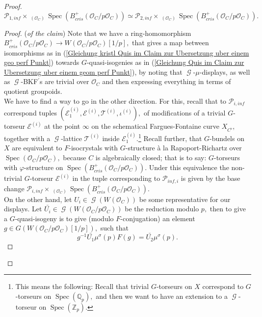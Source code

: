 \documentclass[a4paper,10,5 pt]{amsart}
\theoremstyle{definition}
\DeclareMathOperator{\Spec}{Spec}
\DeclareMathOperator{\Ainf}{\mathbb{A}_{inf}}
\DeclareMathOperator{\G}{\mathcal{G}}
\begin{document}
\begin{proof}
\begin{equation}
\mathcal{P}_{1,inf}\times_{\Ainf(\mathcal{O}_{C})} \Spec(B^{+}_{cris}(\mathcal{O}_{C}/p\mathcal{O}_{C}))\simeq \mathcal{P}_{2,inf}\times_{\Ainf(\mathcal{O}_{C})} \Spec(B^{+}_{cris}(\mathcal{O}_{C}/p\mathcal{O}_{C})).
\end{equation}
\begin{proof}{(\textit{of the claim})}
Note that we have a ring-homomorphism $B^{+}_{cris}(\mathcal{O}_{C}/p\mathcal{O}_{C})\rightarrow W(\mathcal{O}_{C}/p\mathcal{O}_{C})[1/p],$ that gives a map between isomorphisms as in (\ref{Gleichung kristl Quis im Claim zur Ubersetzung uber einem geo perf Punkt}) towards $G$-quasi-isogenies as in (\ref{Gleichung Quis im Claim zur Ubersetzung uber einem geom perf Punkt}), by noting that $\G$-$\mu$-displays, as well as $\G$-BKF$^{\prime}$s are trivial over $\mathcal{O}_{C}$ and then expressing everything in terms of quotient groupoids.
\\
We have to find a way to go in the other direction. For this, recall that to $\mathcal{P}_{i,inf}$ correspond tuples $(\mathcal{E}^{(i)}_{1},\mathcal{E}^{(i)},\mathcal{T}^{(i)},\iota^{(i)}),$ of modifications of a trivial $G$-torseur $\mathcal{E}^{(i)}$ at the point $\infty$ on the schematical Fargues-Fontaine curve $X_{C^{\flat}},$ together with a $\G$-lattice $\mathcal{T}^{(i)}$ inside $\mathcal{E}^{(i)}_{1}.$\footnote{This means the following: Recall that trivial $G$-torseurs on $X$ correspond to $G$-torseurs on $\Spec(\mathbb{Q}_{p}),$ and then we want to have an extension to a $\G$-torseur on $\Spec(\mathbb{Z}_{p}).$} Recall further, that $G$-bundels on $X$ are equivalent to $F$-isocrystals with $G$-structure à la Rapoport-Richartz over $\Spec(\mathcal{O}_{C}/p\mathcal{O}_{C}),$ because $C$ is algebraically closed; that is to say: $G$-torseurs with $\varphi$-structure on $\Spec(B^{+}_{cris}(\mathcal{O}_{C}/p\mathcal{O}_{C})).$ Under this equivalence the non-trivial $G$-torseur $\mathcal{E}^{(i)}$ in the tuple corresponding to $\mathcal{P}_{inf,i}$ is given by the base change $\mathcal{P}_{i,inf}\times_{\Ainf(\mathcal{O}_{C})} \Spec(B^{+}_{cris}(\mathcal{O}_{C}/p\mathcal{O}_{C})).$ 
\\
On the other hand, let $U_{i}\in \G(W(\mathcal{O}_{C}))$ be some representative for our displays. Let $\bar{U_{i}}\in \G(W(\mathcal{O}_{C}/p\mathcal{O}_{C}))$ be the reduction modulo $p,$ then to give a $G$-quasi-isogeny is to give (modulo $F$-conjugation) an element $g\in G(W(\mathcal{O}_{C}/p\mathcal{O}_{C})[1/p]),$ such that
\begin{equation}
g^{-1}\bar{U_{1}}\mu^{\sigma}(p)F(g)=\bar{U_{2}}\mu^{\sigma}(p).

\end{equation}
\end{proof}
\end{proof}
\end{document}
